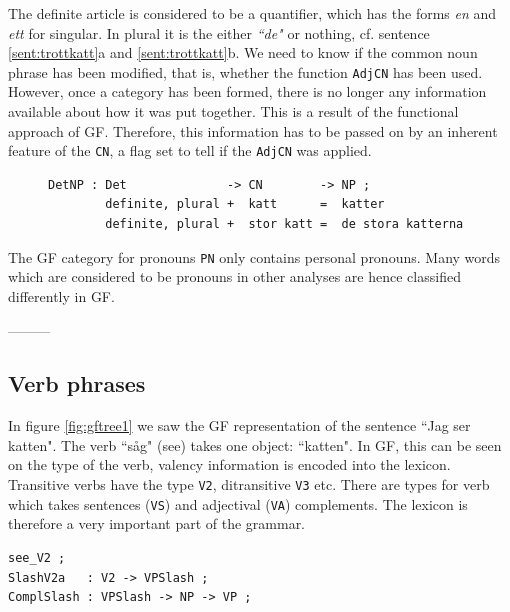 \documentclass{report}
\begin{document}
The definite article is considered to be a quantifier, which has the forms
\emph{en} and \emph{ett} for singular. In plural it
is the either \emph{``de"} or nothing, cf. sentence \ref{sent:trottkatt}a and \ref{sent:trottkatt}b.
We need to know if the common noun phrase 
has been modified, that is, whether the function \verb_AdjCN_ has been used.
However, once a category has been formed, there is no longer any information available
about how it was put together. This is a result of the functional approach
of GF. Therefore, %
this information
has to be passed on by an inherent feature of the \verb-CN-, a flag set to tell
if the \verb-AdjCN- was applied.
\begin{figure}[h]
\begin{verbatim}
DetNP : Det              -> CN        -> NP ;
        definite, plural +  katt      =  katter
        definite, plural +  stor katt =  de stora katterna
\end{verbatim}        
\caption{}\label{gfcode:defmod}
\end{figure}


The GF category for pronouns \verb-PN- only contains personal pronouns.
Many words which are considered to be pronouns in other analyses are hence
classified differently in GF.


---------



\subsection{Verb phrases}
In figure \ref{fig:gftree1} we saw the GF representation of the sentence ``Jag
ser katten". The verb ``såg" (see) takes one object: ``katten".
In GF, this can be seen on the type of the verb,
valency information
is encoded into the lexicon. Transitive verbs have the type \verb-V2-, ditransitive
\verb-V3- etc. There are types for verb which takes sentences (\verb-VS-) and
adjectival (\verb-VA-) complements.
The lexicon is therefore a very important part of the
grammar. 
\begin{verbatim}
see_V2 ; 
SlashV2a   : V2 -> VPSlash ;
ComplSlash : VPSlash -> NP -> VP ;
\end{verbatim}
\end{document}
